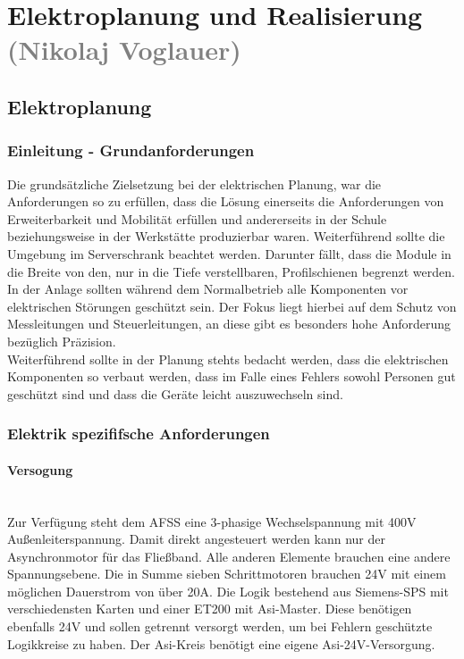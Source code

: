 \section{Elektroplanung und Realisierung \textcolor{gray}{(Nikolaj Voglauer)}}

\subsection{Elektroplanung}
\label{sec:Elektroplanung}

\subsubsection{Einleitung - Grundanforderungen}
    Die grundsätzliche Zielsetzung bei der elektrischen Planung, war die Anforderungen so zu erfüllen, dass die Lösung einerseits die Anforderungen von Erweiterbarkeit und Mobilität erfüllen und andererseits in der Schule beziehungsweise in der Werkstätte produzierbar waren. Weiterführend sollte die Umgebung im Serverschrank beachtet werden. Darunter fällt, dass die Module in die Breite von den, nur in die Tiefe verstellbaren, Profilschienen begrenzt werden.\\
    In der Anlage sollten während dem Normalbetrieb alle Komponenten vor elektrischen Störungen geschützt sein. Der Fokus liegt hierbei auf dem Schutz von Messleitungen und Steuerleitungen, an diese gibt es besonders hohe Anforderung bezüglich Präzision.\\ 
    Weiterführend sollte in der Planung stehts bedacht werden, dass die elektrischen Komponenten so verbaut werden, dass im Falle eines Fehlers sowohl Personen gut geschützt sind und dass die Geräte leicht auszuwechseln sind.\\

\subsubsection{Elektrik spezififsche Anforderungen}
\label{sec:Elektrik spezififsche Anforderungen}

    \paragraph{Versogung}\mbox{}\\
    Zur Verfügung steht dem AFSS eine 3-phasige Wechselspannung mit 400V Außenleiterspannung. Damit direkt angesteuert werden kann nur der Asynchronmotor für das Fließband. Alle anderen Elemente brauchen eine andere Spannungsebene. Die in Summe sieben Schrittmotoren brauchen 24V mit einem möglichen Dauerstrom von über 20A. Die Logik bestehend aus Siemens-SPS mit verschiedensten Karten und einer ET200 mit Asi-Master. Diese benötigen ebenfalls 24V und sollen getrennt versorgt werden, um bei Fehlern geschützte Logikkreise zu haben. Der Asi-Kreis benötigt eine eigene Asi-24V-Versorgung.

